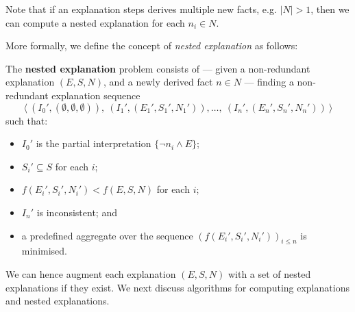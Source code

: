 Note that if an explanation steps derives multiple new facts, e.g. $|N| > 1$, then we can compute a nested explanation for each $n_i \in N$.

More formally, we define the concept of \emph{nested explanation} as follows:

\begin{definition}\label{def:nested-problem}
    The \textbf{nested explanation} problem consists of --- given a non-redundant explanation $(E, S, N)$, and a newly derived fact $n \in N$ --- finding a non-redundant explanation sequence
    \[\langle \ (I_0',(\emptyset,\emptyset,\emptyset)),\ (I_1',(E_1',S_1',N_1')), \dots ,\ (I_n',(E_n',S_n',N_n')) \ \rangle\]
    such that:
    \begin{itemize}
        \item $I_0'$ is the partial interpretation $\{ \neg n_i \wedge E \}$;
        \item $S_i'\subseteq S$ for each $i$;
        \item $f(E_i',S_i',N_i')< f(E, S, N)$ for each $i$;
        \item $I_n'$ is inconsistent; and
        \item a predefined aggregate over the sequence $\left(f(E_i',S_i',N_i')\right)_{i\leq n}$ is minimised.
    \end{itemize}
\end{definition}

We can hence augment each explanation $(E,S,N)$ with a set of nested explanations if they exist. We next discuss algorithms for computing explanations and nested explanations.
